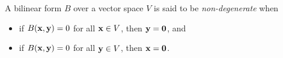 \documentclass[12pt]{article}
\begin{document}
A bilinear form $B$ over a vector space $V$ is said to be {\em non-degenerate} when
\begin{itemize}
\item if $B({{\bf x}},{{\bf y}}) = 0$ for all ${{\bf x}} \in V$, then ${{\bf y}} = {{\bf 0}}$, and
\item if $B({{\bf x}},{{\bf y}}) = 0$ for all ${{\bf y}} \in V$, then ${{\bf x}} = {{\bf 0}}$.
\end{itemize}
\end{document}
